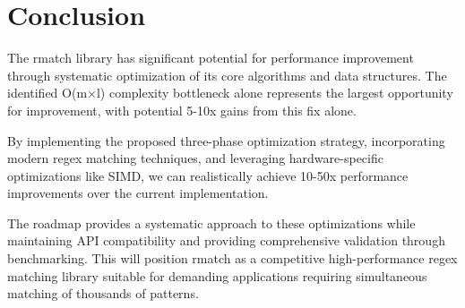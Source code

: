 \documentclass[11pt,a4paper]{article}
\begin{document}
\section{Conclusion}

The rmatch library has significant potential for performance improvement through systematic optimization of its core algorithms and data structures. The identified O(m×l) complexity bottleneck alone represents the largest opportunity for improvement, with potential 5-10x gains from this fix alone.

By implementing the proposed three-phase optimization strategy, incorporating modern regex matching techniques, and leveraging hardware-specific optimizations like SIMD, we can realistically achieve 10-50x performance improvements over the current implementation.

The roadmap provides a systematic approach to these optimizations while maintaining API compatibility and providing comprehensive validation through benchmarking. This will position rmatch as a competitive high-performance regex matching library suitable for demanding applications requiring simultaneous matching of thousands of patterns.



\end{document}
